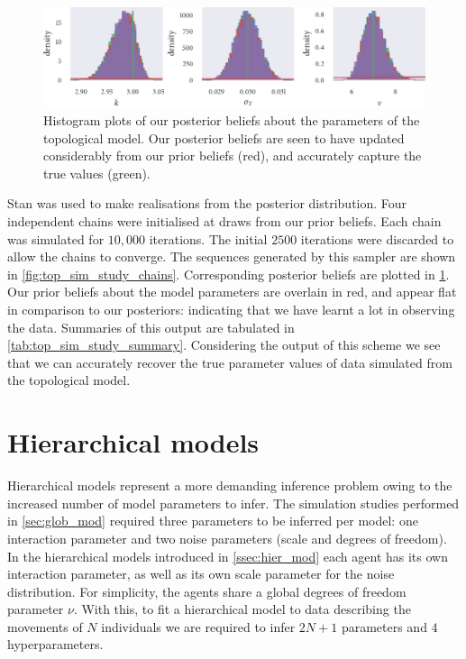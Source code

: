 \begin{figure}[tbp]
  \includegraphics{top_hist.pdf}
  \caption{Histogram plots of our posterior beliefs about the parameters of the
    topological model. Our posterior beliefs are seen to have updated considerably from our
    prior beliefs (red), and accurately capture the true values (green).}
    \label{fig:top_sim_study_hists}
\end{figure}

Stan was used to make realisations from the posterior distribution. Four independent
chains were initialised at draws from our prior beliefs. Each chain was simulated for
$10,000$ iterations. The initial $2500$ iterations were discarded to allow the chains to
converge. The sequences generated by this sampler are shown in
\cref{fig:top_sim_study_chains}. Corresponding posterior beliefs are plotted in
\cref{fig:top_sim_study_hists}. Our prior beliefs about the model parameters are overlain
in red, and appear flat in comparison to our posteriors: indicating that we have learnt a
lot in observing the data. Summaries of this output are tabulated in
\cref{tab:top_sim_study_summary}. Considering the output of this scheme we see that we can
accurately recover the true parameter values of data simulated from the topological model.

\section{Hierarchical models}

Hierarchical models represent a more demanding inference problem owing to the increased
number of model parameters to infer. The simulation studies performed in
\cref{sec:glob_mod} required three parameters to be inferred per model: one interaction
parameter and two noise parameters (scale and degrees of freedom). In the hierarchical
models introduced in \cref{ssec:hier_mod} each agent has its own interaction parameter, as
well as its own scale parameter for the noise distribution. For simplicity, the agents
share a global degrees of freedom parameter $\nu$. With this, to fit a hierarchical model
to data describing the movements of $N$ individuals we are required to infer $2N+1$
parameters and $4$ hyperparameters.

